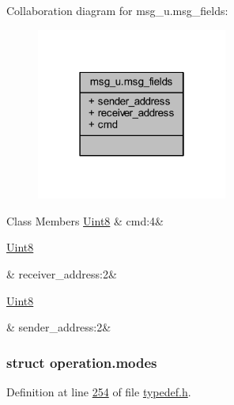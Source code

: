Collaboration diagram for msg\+\_\+u.\+msg\+\_\+fields\+:
\nopagebreak
\begin{figure}[H]
\begin{center}
\leavevmode
\includegraphics[width=178pt]{d0/d2f/a00259}
\end{center}
\end{figure}
\begin{DoxyFields}{Class Members}
\hypertarget{a00001_adfff0a7fa1a55c8c1a4966c19f6da452}{\hyperlink{a00001_a979e3e23b9a449e69ab6a8a83b6042f8}{Uint8}}\label{a00001_adfff0a7fa1a55c8c1a4966c19f6da452}
&
cmd\+:4&
\\
\hline

\hypertarget{a00001_a4bccf76d801406a00ded7776632c1465}{\hyperlink{a00001_a979e3e23b9a449e69ab6a8a83b6042f8}{Uint8}}\label{a00001_a4bccf76d801406a00ded7776632c1465}
&
receiver\+\_\+address\+:2&
\\
\hline

\hypertarget{a00001_a91385690c3a1367cd325ca74a06410a6}{\hyperlink{a00001_a979e3e23b9a449e69ab6a8a83b6042f8}{Uint8}}\label{a00001_a91385690c3a1367cd325ca74a06410a6}
&
sender\+\_\+address\+:2&
\\
\hline

\end{DoxyFields}
\label{d1/dc1/a00092}
\hypertarget{a00001_d1/dc1/a00092}{}
\subsubsection{struct operation.\+modes}


Definition at line \hyperlink{a00001_source_l00254}{254} of file \hyperlink{a00001_source}{typedef.\+h}.




